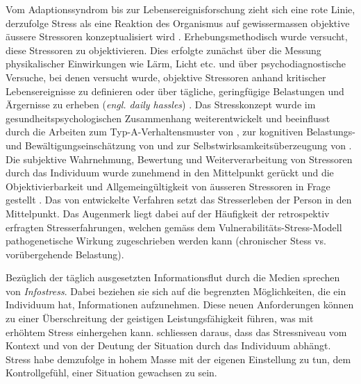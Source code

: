 Vom Adaptionssyndrom \cite{Selye1936} bis zur Lebensereignisforschung zieht sich eine rote Linie, derzufolge Stress als eine Reaktion des Organismus auf gewissermassen objektive äussere Stressoren konzeptualisiert wird \cite{Fliege2001}. Erhebungsmethodisch wurde versucht, diese Stressoren zu objektivieren. Dies erfolgte zunächst über die Messung physikalischer Einwirkungen wie Lärm, Licht etc. und über psychodiagnostische Versuche, bei denen versucht wurde, objektive Stressoren anhand kritischer Lebensereignisse zu definieren \cite{Holmes1980} oder über tägliche, geringfügige Belastungen und Ärgernisse zu erheben (\textit{engl. daily hassles}) \cite{Quast1986}. Das Stresskonzept wurde im gesundheitspsychologischen Zusammenhang weiterentwickelt und beeinflusst durch die Arbeiten zum Typ-A-Verhaltensmuster von , zur kognitiven Belastungs- und Bewältigungseinschätzung von  und zur Selbstwirksamkeitsüberzeugung von . Die subjektive Wahrnehmung, Bewertung und Weiterverarbeitung von Stressoren durch das Individuum wurde zunehmend in den Mittelpunkt gerückt und die Objektivierbarkeit und Allgemeingültigkeit von äusseren Stressoren in Frage gestellt \cite{Fliege2001}. Das von  entwickelte Verfahren setzt das Stresserleben der Person in den Mittelpunkt. Das Augenmerk liegt dabei auf der Häufigkeit der retrospektiv erfragten Stresserfahrungen, welchen gemäss dem Vulnerabilitäts-Stress-Modell pathogenetische Wirkung zugeschrieben werden kann (chronischer Stess vs. vorübergehende Belastung).

Bezüglich der täglich ausgesetzten Informationsflut durch die Medien sprechen  von \textit{Infostress}. Dabei beziehen sie sich auf die begrenzten Möglichkeiten, die ein Individuum hat, Informationen aufzunehmen. Diese neuen Anforderungen können zu einer Überschreitung der geistigen Leistungsfähigkeit führen, was mit erhöhtem Stress einhergehen kann.  schliessen daraus, dass das Stressniveau vom Kontext und von der Deutung der Situation durch das Individuum abhängt. Stress habe demzufolge in hohem Masse mit der eigenen Einstellung zu tun, dem Kontrollgefühl, einer Situation gewachsen zu sein.

